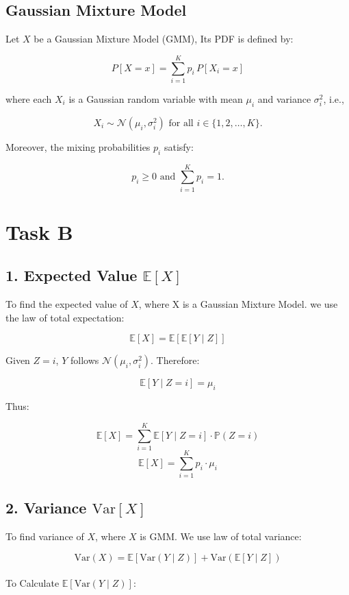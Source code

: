 \documentclass{article}
\begin{document}
\subsection*{Gaussian Mixture Model}

Let \( X \) be a Gaussian Mixture Model (GMM), Its PDF is defined by:

\[
P[X = x] = \sum_{i=1}^{K} p_i \, P[X_i = x]
\]

where each \( X_i \) is a Gaussian random variable with mean \( \mu_i \) and variance \( \sigma_i^2 \), i.e.,

\[
X_i \sim \mathcal{N}(\mu_i, \sigma_i^2) \text{ for all } i \in \{1, 2, \ldots, K\}.
\]

Moreover, the mixing probabilities \( p_i \) satisfy:

\[
p_i \geq 0 \text{ and } \sum_{i=1}^{K} p_i = 1.
\]

\section*{Task B}
\subsection*{1. Expected Value \( \mathbb{E}[X] \)}

To find the expected value of \( X \), where X is a Gaussian Mixture Model.
we use the law of total expectation:

\[
\mathbb{E}[X] = \mathbb{E}\left[\mathbb{E}[Y \mid Z]\right]
\]

Given \( Z = i \), \( Y \) follows \( \mathcal{N}(\mu_i, \sigma_i^2) \). Therefore:

\[
\mathbb{E}[Y \mid Z = i] = \mu_i
\]

Thus:

\[
\mathbb{E}[X] = \sum_{i=1}^{K} \mathbb{E}[Y \mid Z = i] \cdot \mathbb{P}(Z = i)  
\]
\[
\mathbb{E}[X] = \sum_{i=1}^{K} p_i \cdot \mu_i
\]

\subsection*{2. Variance \( \text{Var}[X] \)}

To find variance of \( X \), where \( X \) is GMM. We use law of total variance:

\[
\text{Var}(X) = \mathbb{E}[\text{Var}(Y \mid Z)] + \text{Var}(\mathbb{E}[Y \mid Z])
\] \\

To Calculate \( \mathbb{E}[\text{Var}(Y \mid Z)] \):
\end{document}
